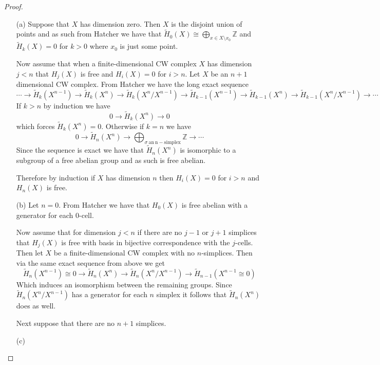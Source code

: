 \documentclass[10pt]{article}
\newcommand{\bb}[1]{\mathbb{#1}}
\newcommand{\wt}[1]{\widetilde{#1}}
\theoremstyle{plain}
\theoremstyle{remark}
\begin{document}
\begin{proof}
  \begin{enumerate}
  \item[(a)]
    Suppose that $X$ has dimension zero. Then $X$ is the disjoint union of points and as such
    from Hatcher we have that $\wt{H}_0(X)\cong \bigoplus_{x\in X\setminus x_0}\bb{Z}$ and $\wt{H}_k(X)=0$ for $k>0$ where
    $x_0$ is just some point.

    Now assume that when a finite-dimensional CW complex $X$ has dimension $j<n$
    that $H_j(X)$ is free and $H_i(X)=0$ for $i>n$. Let $X$ be an $n+1$ dimensional
    CW complex. From Hatcher we have the long exact sequence
    \[
      \cdots \rightarrow \wt{H}_k(X^{n-1})\rightarrow \wt{H}_k(X^n) \rightarrow \wt{H}_k(X^n/X^{n-1}) \rightarrow \wt{H}_{k-1}(X^{n-1}) \rightarrow \wt{H}_{k-1}(X^n) \rightarrow \wt{H}_{k-1}(X^n/X^{n-1}) \rightarrow \cdots
    \]
    If $k>n$ by induction we have
    \[
      0 \rightarrow \wt{H}_k(X^n) \rightarrow 0
    \]
    which forces $\wt{H}_k(X^n)=0$. Otherwise if $k=n$ we have
    \[
      0 \rightarrow \wt{H}_n(X^n) \rightarrow \bigoplus_{\sigma\mathrm{\ an\ n-simplex}}\bb{Z} \rightarrow \cdots
    \]
    Since the sequence is exact we have that $\wt{H}_n(X^n)$ is isomorphic to a
    subgroup of a free abelian group and as such is free abelian.

    Therefore by induction if $X$ has dimension $n$ then $H_i(X)=0$ for $i>n$ and
    $H_n(X)$ is free.
  \item[(b)] Let $n=0$. From Hatcher we have that $H_0(X)$ is free abelian
    with a generator for each 0-cell.

    Now assume that for dimension $j<n$ if there are no $j-1$ or $j+1$ simplices
    that $H_j(X)$ is free with basis in bijective correspondence with the $j$-cells.
    Then let $X$ be a finite-dimensional CW complex with no $n$-simplices. Then
    via the same exact sequence from above we get
    \[
      \wt{H}_n(X^{n-1})\cong 0\rightarrow\wt{H}_n(X^n)\rightarrow\wt{H}_n(X^n/X^{n-1})\rightarrow\wt{H}_{n-1}(X^{n-1}\cong 0)
    \]
    Which induces an isomorphism between the remaining groups. Since
    $\wt{H}_n(X^n/X^{n-1})$ has a generator for each $n$ simplex it follows
    that $\wt{H}_n(X^n)$ does as well.

    Next suppose that there are no $n+1$ simplices.
  \item[(c)]
  \end{enumerate}
\end{proof}
\end{document}
